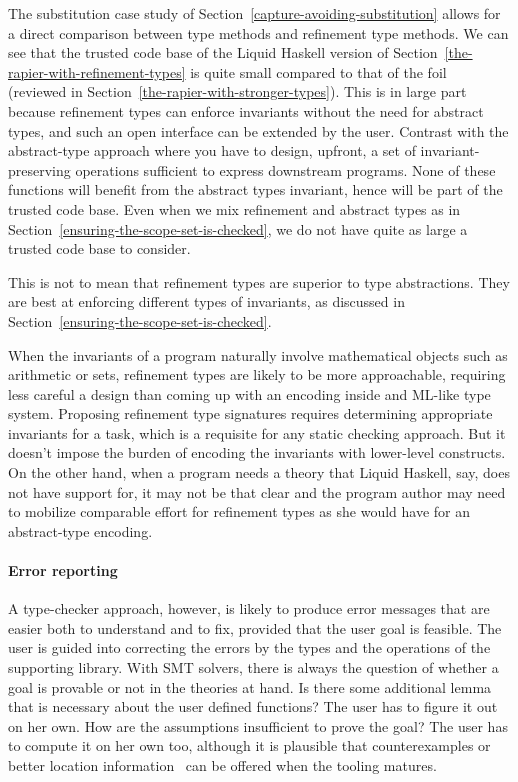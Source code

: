 \documentclass[sigconf, review]{acmart}
\begin{document}
The substitution case study of Section~\ref{capture-avoiding-substitution}
allows for a direct comparison between type methods and refinement type methods. We
can see that the trusted code base of the Liquid Haskell version of
Section~\ref{the-rapier-with-refinement-types} is quite small compared to that
of the foil~\cite{maclaurin23} (reviewed in
Section~\ref{the-rapier-with-stronger-types}). This is in large part
because refinement types can enforce invariants without the need for
abstract types, and such an open interface can be extended by the user.
Contrast with the abstract-type approach where you have to design, upfront, a
set of invariant-preserving operations sufficient to express downstream programs.
None of these functions will benefit from the abstract types invariant, hence
will be part of the trusted code base. Even when we mix refinement and abstract
types as in Section~\ref{ensuring-the-scope-set-is-checked}, we do not have quite
as large a trusted code base to consider.

This is not to mean that refinement types are superior to type abstractions.
They are best at enforcing different types of invariants, as discussed in
Section~\ref{ensuring-the-scope-set-is-checked}.

When the invariants of a program naturally involve mathematical objects such as
arithmetic or sets, refinement types are likely to be more approachable,
requiring less careful a design than coming up with an encoding inside and
ML-like type system. Proposing refinement type signatures requires
determining appropriate invariants for a task, which is a requisite for any static
checking approach. But it doesn't impose the burden of encoding the invariants with lower-level
constructs. On the other hand, when a program needs a theory that Liquid
Haskell, say, does not have support for, it may not be that clear and the program
author may need to mobilize comparable effort for refinement types as she would
have for an abstract-type encoding.

\paragraph{Error reporting} A type-checker approach, however, is likely to produce error messages that
are easier both to understand and to fix, provided that the user goal is feasible.
The user is guided into correcting the errors
by the types and the operations of the supporting library. With SMT solvers,
there is always the question of whether a goal is provable or not in the
theories at hand. Is there some additional lemma that is necessary about the user defined
functions? The user has to figure it out on her own. How are the assumptions
insufficient to prove the goal? The user has to compute it on her own too,
although it is plausible that counterexamples or better location information~\cite{webbers24}
can be offered when the tooling matures.
\end{document}
